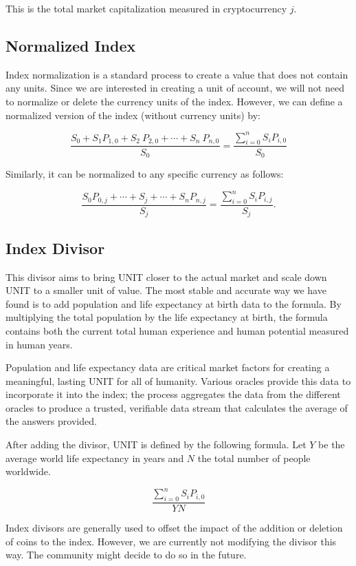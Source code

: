 \documentclass[12pt]{article}
\begin{document}
This is the total market capitalization measured in cryptocurrency $j$.

\subsection{Normalized Index}

Index normalization is a standard process to create a value that does not contain any units. Since we are interested in creating a unit of account, we will not need to normalize or delete the currency units of the index. However, we can define a normalized version of the index (without currency units) by:

$$
\frac{S_0+S_1 P_{1,0}+ S_2\ P_{2,0}+\cdots+ S_n\ P_{n,0}}{S_0}= \frac{\displaystyle{\sum_{i=0}^{n} S_iP_{i,0}}}{S_0}
$$

Similarly, it can be normalized to any specific currency as follows:


$$
\frac{S_0P_{0,j}+\cdots+S_j+\cdots+S_nP_{n,j}}{S_j} = \frac{\displaystyle{\sum_{i=0}^{n} S_iP_{i,j}}}{S_j}.
$$


\subsection{Index Divisor}

This divisor aims to bring UNIT closer to the actual market and scale down UNIT to a smaller unit of value. The most stable and accurate way we have found is to add population and life expectancy at birth data to the formula. By multiplying the total population by the life expectancy at birth, the formula contains both the current total human experience and human potential measured in human years.

Population and life expectancy data are critical market factors for creating a meaningful, lasting UNIT for all of humanity. Various oracles provide this data to incorporate it into the index; the process aggregates the data from the different oracles to produce a trusted, verifiable data stream that calculates the average of the answers provided. 

After adding the divisor, UNIT is defined by the following formula. Let $Y$ be the average world life expectancy in years and $N$ the total number of people worldwide. 

$$
\frac{\displaystyle{\sum_{i=0}^{n} S_iP_{i,0}}}{Y N}
$$

Index divisors are generally used to offset the impact of the addition or deletion of coins to the index. However, we are currently not modifying the divisor this way. The community might decide to do so in the future. 
\end{document}
